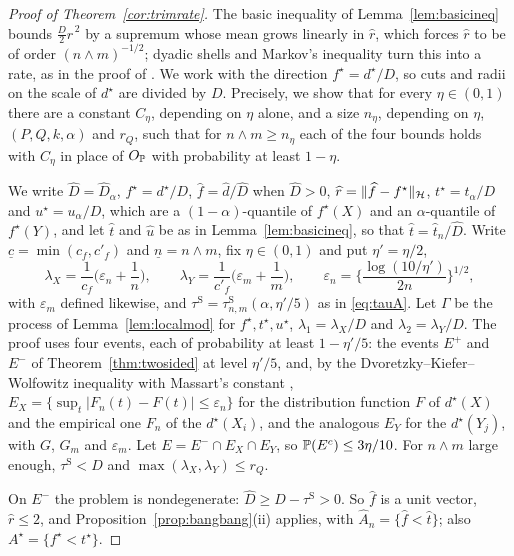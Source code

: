 \begin{proof}[Proof of Theorem~\ref{cor:trimrate}]
The basic inequality of Lemma~\ref{lem:basicineq} bounds $\tfrac D2\widehat r^{\,2}$ by a supremum whose mean grows
linearly in $\widehat r$, which forces $\widehat r$ to be of order $(n\wedge m)^{-1/2}$; dyadic shells and Markov's
inequality turn this into a rate, as in the proof of \citet[Theorem~3.2.5]{vandervaart1996weak}. We work with the
direction $f^\star=d^\star/D$, so cuts and radii on the scale of $d^\star$ are divided by $D$. Precisely, we show
that for every $\eta\in(0,1)$ there are a constant $C_\eta$, depending on $\eta$ alone, and a size $n_\eta$, depending on
$\eta$, $(P,Q,k,\alpha)$ and $r_Q$, such that for $n\wedge m\ge n_\eta$ each of the four bounds holds with $C_\eta$ in
place of $O_{\mathbb{P}}$ with probability at least $1-\eta$.

We write $\widehat D=\widehat D_\alpha$, $f^\star=d^\star/D$, $\widehat f=\widehat d/\widehat D$ when $\widehat D>0$,
$\widehat r=\|\widehat f-f^\star\|_{\mathcal{H}}$, $t^\star=t_\alpha/D$ and $u^\star=u_\alpha/D$, which are a
$(1-\alpha)$-quantile of $f^\star(X)$ and an $\alpha$-quantile of $f^\star(Y)$, and let $\widehat t$ and $\widehat u$ be
as in Lemma~\ref{lem:basicineq}, so that $\widehat t=\widehat t_n/\widehat D$. Write $\underline c=\min(c_f,c'_f)$ and
$\underline n=n\wedge m$, fix $\eta\in(0,1)$ and put $\eta'=\eta/2$,
\[
\lambda_X=\frac1{c_f}\Big(\varepsilon_n+\frac1n\Big),\qquad
\lambda_Y=\frac1{c'_f}\Big(\varepsilon_m+\frac1m\Big),\qquad
\varepsilon_n=\Big\{\frac{\log(10/\eta')}{2n}\Big\}^{1/2},
\]
with $\varepsilon_m$ defined likewise, and $\tau^{\mathrm S}=\tau^{\mathrm S}_{n,m}(\alpha,\eta'/5)$ as in
\eqref{eq:tauA}. Let $\Gamma$ be the process of Lemma~\ref{lem:localmod} for $f^\star,t^\star,u^\star$,
$\lambda_1=\lambda_X/D$ and $\lambda_2=\lambda_Y/D$. The proof uses four events, each of probability at least
$1-\eta'/5$: the events $E^+$ and $E^-$ of Theorem~\ref{thm:twosided} at level $\eta'/5$, and, by the
Dvoretzky--Kiefer--Wolfowitz inequality with Massart's constant \citep{massart1990dkw},
$E_X=\{\sup_t|F_n(t)-F(t)|\le\varepsilon_n\}$ for the distribution function $F$ of $d^\star(X)$ and the empirical one
$F_n$ of the $d^\star(X_i)$, and the analogous $E_Y$ for the $d^\star(Y_j)$, with $G$, $G_m$ and $\varepsilon_m$. Let
$E=E^-\cap E_X\cap E_Y$, so $\mathbb{P}(E^c)\le3\eta/10$. For $n\wedge m$ large enough, $\tau^{\mathrm S}<D$ and $\max(\lambda_X,\lambda_Y)\le r_Q$.

On $E^-$ the problem is nondegenerate: $\widehat D\ge D-\tau^{\mathrm S}>0$. So $\widehat f$ is a unit vector,
$\widehat r\le2$, and Proposition~\ref{prop:bangbang}(ii) applies, with $\widehat A_n=\{\widehat f<\widehat t\}$; also
$A^\star=\{f^\star<t^\star\}$.


\end{proof}

